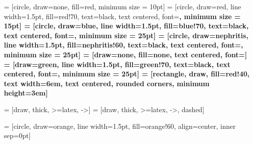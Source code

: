 
 = [circle, draw=none, fill=red, minimum size = 10pt]
 = [circle, draw=red, line width=1.5pt, fill=red!70, text=black,
text centered, font=\bf \normalsize, minimum size = 15pt]
 = [circle, draw=blue, line width=1.5pt, fill=blue!70, text=black, text centered, font=\bf \normalsize, minimum size = 25pt]
 = [circle, draw=nephritis, line width=1.5pt, fill=nephritis!60, text=black, text centered, font=\bf \normalsize, minimum size = 25pt]
 = [draw=none, fill=none, text centered, font=\bf \normalsize]
= [draw=green, line width=1.5pt, fill=green!70, text=black,
text centered, font=\bf \normalsize, minimum size = 25pt]
 = [rectangle, draw, fill=red!40,
text width=6em, text centered, rounded corners, minimum height=3em]

  = [draw, thick, >=latex, ->]
  = [draw, thick, >=latex, ->, dashed]

 = [circle, draw=orange, line width=1.5pt, fill=orange!60, align=center, inner sep=0pt]


